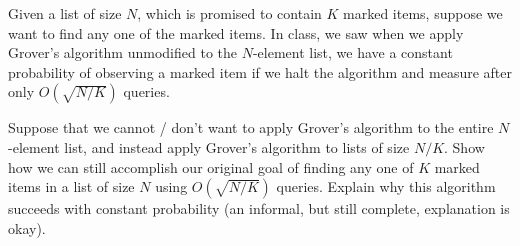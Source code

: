 \begin{solution}[label=ques:3a]
  \begin{question}
    Given a list of size $N$, which is promised to contain $K$ marked items, suppose we want to find any one of the marked items. 
In class, we saw when we apply Grover's algorithm unmodified to the $N$-element list, we have a constant probability of observing a marked item if we halt the algorithm and measure after only $O({\sqrt{N/K}})$ queries.

Suppose that we cannot / don't want to apply Grover's algorithm to the entire $N$-element list, and instead apply Grover's algorithm to lists of size $N/K$. Show how we can still accomplish our original goal of finding any one of $K$ marked items in a list of size $N$ using $O(\sqrt{N/K})$ queries. Explain why this algorithm succeeds with constant probability (an informal, but still complete, explanation is okay).


\end{question}
\end{solution}
